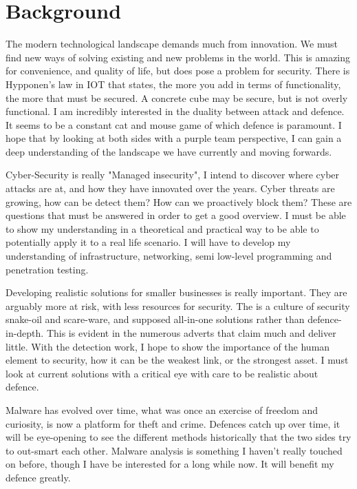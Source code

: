 
\section{Background}
The modern technological landscape demands much from innovation. 
We must find new ways of solving existing and new problems in the world. 
This is amazing for convenience, and quality of life, but does pose a problem for security. 
There is Hypponen's law in IOT that states, the more you add in terms of functionality, the more that must be secured. 
A concrete cube may be secure, but is not overly functional. I am incredibly interested in the duality between attack and defence. 
It seems to be a constant cat and mouse game of which defence is paramount. 
I hope that by looking at both sides with a purple team perspective, I can gain a deep understanding of the landscape we have currently and moving forwards. 

Cyber-Security is really "Managed insecurity", I intend to discover where cyber attacks are at, and how they have innovated over the years.
Cyber threats are growing, how can be detect them? How can we proactively block them? These are questions that must be answered in order to get a good overview.
I must be able to show my understanding in a theoretical and practical way to be able to potentially apply it to a real life scenario. 
I will have to develop my understanding of infrastructure, networking, semi low-level programming and penetration testing.

Developing realistic solutions for smaller businesses is really important. They are arguably more at risk, with less resources for security. 
The is a culture of security snake-oil and scare-ware, and supposed all-in-one solutions rather than defence-in-depth. This is evident in the numerous adverts that claim much and deliver little.
With the detection work, I hope to show the importance of the human element to security, how it can be the weakest link, or the strongest asset. 
I must look at current solutions with a critical eye with care to be realistic about defence. 

Malware has evolved over time, what was once an exercise of freedom and curiosity, is now a platform for theft and crime. 
Defences catch up over time, it will be eye-opening to see the different methods historically that the two sides try to out-smart each other.
Malware analysis is something I haven't really touched on before, though I have be interested for a long while now. It will benefit my defence greatly.



